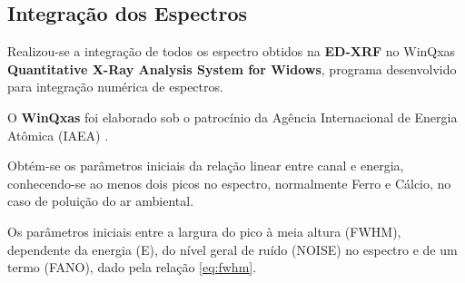 





\subsection{Integração dos Espectros}

Realizou-se a integração de todos os espectro obtidos na \textbf{ED-XRF} no
WinQxas \textbf{Quantitative X-Ray Analysis System for Widows},
programa desenvolvido para integração numérica de espectros. 

O \textbf{WinQxas} foi elaborado sob o patrocínio da Agência Internacional 
de Energia Atômica (IAEA) \citep{capote2000}.

Obtém-se os parâmetros iniciais da relação linear entre canal e energia,
conhecendo-se ao menos dois picos no espectro, normalmente Ferro e Cálcio, 
no caso de poluição do ar ambiental. 

Os parâmetros iniciais entre a largura do pico à meia altura (FWHM),
dependente da energia (E), do nível geral de ruído (NOISE) no espectro 
e de um termo (FANO), dado pela relação \ref{eq:fwhm}. 

